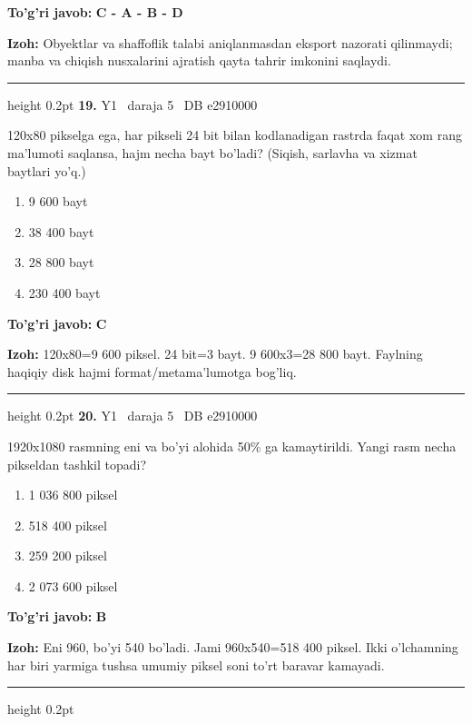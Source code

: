 \documentclass[10pt,a4paper,oneside]{article}
\begin{document}
\begin{tcolorbox}[enhanced,breakable,colback=teal!4,colframe=teal!45!black,boxrule=0.45pt,arc=1.2mm,left=2.8mm,right=2.8mm,top=2mm,bottom=2mm,before skip=2mm,after skip=2mm]
\textbf{\color{teal}To'g'ri javob:} \textbf{C - A - B - D}
\par\smallskip
\textbf{Izoh:} Obyektlar va shaffoflik talabi aniqlanmasdan eksport nazorati qilinmaydi; manba va chiqish nusxalarini ajratish qayta tahrir imkonini saqlaydi.
\end{tcolorbox}
\vspace{2mm}\hrule height 0.2pt \vspace{4mm}
\hypertarget{q19}{\textbf{\color{ink}19.}}  {\color{muted}\scriptsize Y1 \textbullet\ daraja 5 \textbullet\ DB e2910000}
\par
120x80 pikselga ega, har pikseli 24 bit bilan kodlanadigan rastrda faqat xom rang ma'lumoti saqlansa, hajm necha bayt bo'ladi? (Siqish, sarlavha va xizmat baytlari yo'q.)
\begin{enumerate}[label=\Alph*),leftmargin=9mm]
\item 9 600 bayt
\item 38 400 bayt
\item 28 800 bayt
\item 230 400 bayt
\end{enumerate}
\begin{tcolorbox}[enhanced,breakable,colback=teal!4,colframe=teal!45!black,boxrule=0.45pt,arc=1.2mm,left=2.8mm,right=2.8mm,top=2mm,bottom=2mm,before skip=2mm,after skip=2mm]
\textbf{\color{teal}To'g'ri javob:} \textbf{C}
\par\smallskip
\textbf{Izoh:} 120x80=9 600 piksel. 24 bit=3 bayt. 9 600x3=28 800 bayt. Faylning haqiqiy disk hajmi format/metama'lumotga bog'liq.
\end{tcolorbox}
\vspace{2mm}\hrule height 0.2pt \vspace{4mm}
\hypertarget{q20}{\textbf{\color{ink}20.}}  {\color{muted}\scriptsize Y1 \textbullet\ daraja 5 \textbullet\ DB e2910000}
\par
1920x1080 rasmning eni va bo'yi alohida 50\% ga kamaytirildi. Yangi rasm necha pikseldan tashkil topadi?
\begin{enumerate}[label=\Alph*),leftmargin=9mm]
\item 1 036 800 piksel
\item 518 400 piksel
\item 259 200 piksel
\item 2 073 600 piksel
\end{enumerate}
\begin{tcolorbox}[enhanced,breakable,colback=teal!4,colframe=teal!45!black,boxrule=0.45pt,arc=1.2mm,left=2.8mm,right=2.8mm,top=2mm,bottom=2mm,before skip=2mm,after skip=2mm]
\textbf{\color{teal}To'g'ri javob:} \textbf{B}
\par\smallskip
\textbf{Izoh:} Eni 960, bo'yi 540 bo'ladi. Jami 960x540=518 400 piksel. Ikki o'lchamning har biri yarmiga tushsa umumiy piksel soni to'rt baravar kamayadi.
\end{tcolorbox}
\vspace{2mm}\hrule height 0.2pt \vspace{4mm}
\end{document}

